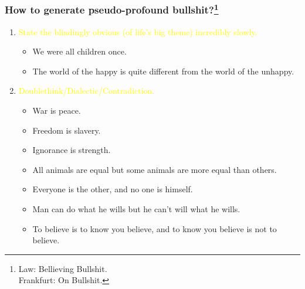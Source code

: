 \documentclass[UTF8,aspectratio=43,11pt,colorlinks,compress,openany]{beamer}%
\begin{document}
\begin{frame}\frametitle{How to generate pseudo-profound bullshit?\footnote{Law: Bellieving Bullshit.\\
Frankfurt: On Bullshit.}}
	\begin{enumerate}
		\item \textcolor{yellow}{State the blindingly obvious (of life's big theme) incredibly slowly.}
		\begin{itemize}
			\item We were all children once.
			\item The world of the happy is quite different from the world of the unhappy.
		\end{itemize}
		\item \textcolor{yellow}{Doublethink/Dialectic/Contradiction.}
		\begin{itemize}
			\item War is peace.
			\item Freedom is slavery.
			\item Ignorance is strength.
			\item All animals are equal but some animals are more equal than others.
			\item Everyone is the other, and no one is himself.
			\item Man can do what he wills but he can't will what he wills.
			\item To believe is to know you believe, and to know you believe is not to believe.
		\end{itemize}
	\end{enumerate}
\end{frame}
\end{document}
